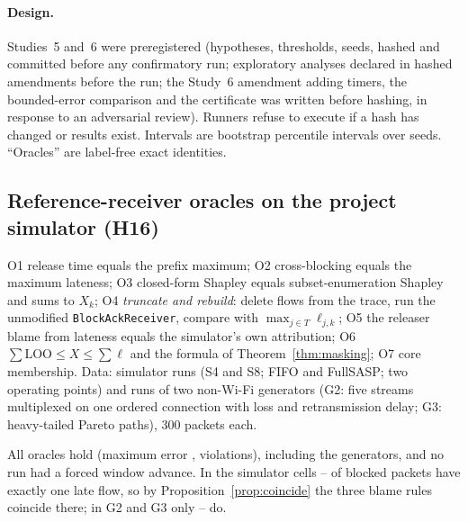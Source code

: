 \documentclass[11pt]{article}
\newcommand{\tagC}{\textsc{conf}}
\theoremstyle{definition}
\begin{document}
\paragraph{Design.} Studies~5 and~6 were preregistered (hypotheses, thresholds, seeds, hashed and committed before any confirmatory run; exploratory analyses declared in hashed amendments before the run; the Study~6 amendment adding timers, the bounded-error comparison and the certificate was written before hashing, in response to an adversarial review). Runners refuse to execute if a hash has changed or results exist. Intervals are bootstrap percentile intervals over seeds. ``Oracles'' are label-free exact identities.

\subsection{Reference-receiver oracles on the project simulator (H16)}\label{sec:val-exact}
O1 release time equals the prefix maximum; O2 cross-blocking equals the maximum lateness; O3 closed-form Shapley equals subset-enumeration Shapley and sums to $X_k$; O4 \emph{truncate and rebuild}: delete flows from the trace, run the unmodified \texttt{BlockAckReceiver}, compare with $\max_{j\in T}\ell_{j,k}$; O5 the releaser blame from lateness equals the simulator's own attribution; O6 $\sum\mathrm{LOO}\le X\le\sum\ell$ and the formula of Theorem~\ref{thm:masking}; O7 core membership. Data: \FvSimRuns{} simulator runs (S4 and S8; FIFO and FullSASP; two operating points) and \FvGenRuns{} runs of two non-Wi-Fi generators (G2: five streams multiplexed on one ordered connection with loss and retransmission delay; G3: heavy-tailed Pareto paths), 300 packets each.
\begin{table}[h]
\centering\footnotesize

\caption{H16 (\tagC{}): oracle errors over all runs. ``one late flow'' is the share of blocked packets with exactly one late flow. Maximum error over O1--O6; tolerance $10^{-9}$; O6/O7 violation counts \FvViol{}. Cells are (load multiplier, link-2 extra delay in ms).}
\end{table}
All oracles hold (maximum error \FvMaxErr{}, \FvViol{} violations), including the generators, and no run had a forced window advance. In the simulator cells \FvSingleSimMin{}--\FvSingleSimMax{} of blocked packets have exactly one late flow, so by Proposition~\ref{prop:coincide} the three blame rules coincide there; in G2 and G3 only \FvSingleGenA{}--\FvSingleGenB{} do.
\end{document}
